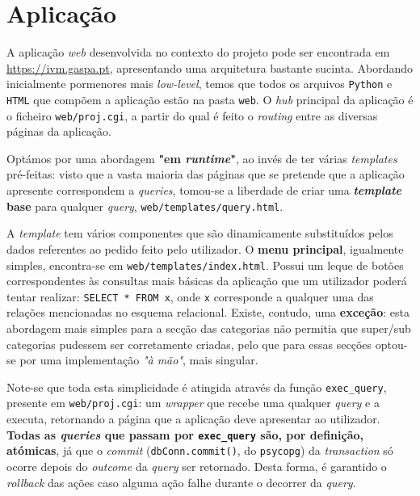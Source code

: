 \documentclass[12pt,a4paper]{article}
\begin{document}
\section*{Aplicação}

A aplicação \textit{web} desenvolvida no contexto do projeto pode ser encontrada
em \url{https://ivm.gaspa.pt}, apresentando uma arquitetura bastante sucinta.
Abordando inicialmente pormenores mais \textit{low-level}, temos que todos os arquivos
\texttt{Python} e \texttt{HTML} que compõem a aplicação estão na pasta \texttt{web}.
O \textit{hub} principal da aplicação é o ficheiro \texttt{web/proj.cgi}, a partir do qual
é feito o \textit{routing} entre as diversas páginas da aplicação.

Optámos por uma abordagem \textbf{"em \textit{runtime}"}, ao invés de ter várias \textit{templates}
pré-feitas: visto que a vasta maioria das páginas que se pretende que a aplicação
apresente correspondem a \textit{queries}, tomou-se a liberdade de criar uma
\textbf{\textit{template} base} para qualquer \textit{query}, \texttt{web/templates/query.html}.

A \textit{template} tem vários componentes que são dinamicamente substituídos
pelos dados referentes ao pedido feito pelo utilizador. O \textbf{menu principal},
igualmente simples, encontra-se em \texttt{web/templates/index.html}. Possui um
leque de botões correspondentes às consultas mais básicas da aplicação que um
utilizador poderá tentar realizar: \texttt{SELECT * FROM x}, onde \texttt{x} corresponde a qualquer
uma das relações mencionadas no esquema relacional. Existe, contudo, uma \textbf{exceção}:
esta abordagem mais simples para a secção das categorias não permitia que
super/sub categorias pudessem ser corretamente criadas, pelo que para essas secções
optou-se por uma implementação \textit{"à mão"}, mais singular.

Note-se que toda esta simplicidade é atingida através da função \texttt{exec\_query},
presente em \texttt{web/proj.cgi}: um \textit{wrapper} que recebe uma qualquer
\textit{query} e a executa, retornando a página que a aplicação deve apresentar
ao utilizador. \textbf{Todas as \textit{queries} que passam por \texttt{exec\_query} são,
  por definição, atómicas}, já que o \textit{commit} (\texttt{dbConn.commit()}, do \texttt{psycopg})
da \textit{transaction} só ocorre depois do \textit{outcome} da \textit{query}
ser retornado. Desta forma, é garantido o \textit{rollback} das ações caso alguma
ação falhe durante o decorrer da \textit{query}.
\end{document}
